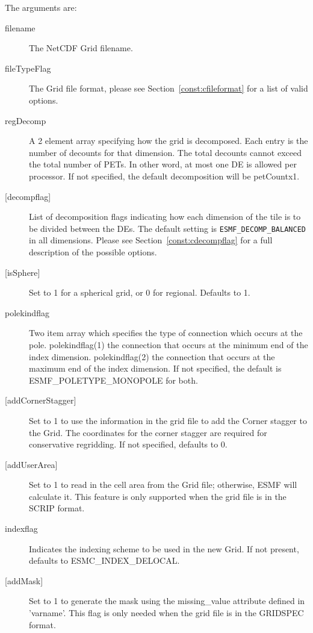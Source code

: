     The arguments are:
    \begin{description}
   \item[filename]
       The NetCDF Grid filename.
   \item[fileTypeFlag]
       The Grid file format, please see Section~\ref{const:cfileformat}
           for a list of valid options. 
   \item[regDecomp] 
        A 2 element array specifying how the grid is decomposed.
        Each entry is the number of decounts for that dimension.
        The total decounts cannot exceed the total number of PETs.  In other
        word, at most one DE is allowed per processor.
        If not specified, the default decomposition will be petCountx1.
   \item[{[decompflag]}]
        List of decomposition flags indicating how each dimension of the
        tile is to be divided between the DEs. The default setting
        is {\tt ESMF\_DECOMP\_BALANCED} in all dimensions. Please see
        Section~\ref{const:cdecompflag} for a full description of the 
        possible options. 
   \item[{[isSphere]}]
        Set to 1 for a spherical grid, or 0 for regional. Defaults to 1.
    \item[polekindflag]
        Two item array which specifies the type of connection which occurs at the
        pole. polekindflag(1) the connection that occurs at the minimum end of the
        index dimension. polekindflag(2) the connection that occurs at the maximum
        end of the index dimension. If not specified, the default is
        ESMF\_POLETYPE\_MONOPOLE for both.
   \item[{[addCornerStagger]}]
        Set to 1 to use the information in the grid file to add the Corner stagger to 
        the Grid. The coordinates for the corner stagger are required for conservative
        regridding. If not specified, defaults to 0. 
   \item[{[addUserArea]}]
        Set to 1 to read in the cell area from the Grid file; otherwise, ESMF will 
        calculate it.  This feature is only supported when the grid file is in the SCRIP
        format.  
    \item[indexflag]
        Indicates the indexing scheme to be used in the new Grid. If not present,
        defaults to ESMC\_INDEX\_DELOCAL.
   \item[{[addMask]}]
        Set to 1 to generate the mask using the missing\_value attribute defined in 'varname'.
        This flag is only needed when the grid file is in the GRIDSPEC format.

\end{description}
